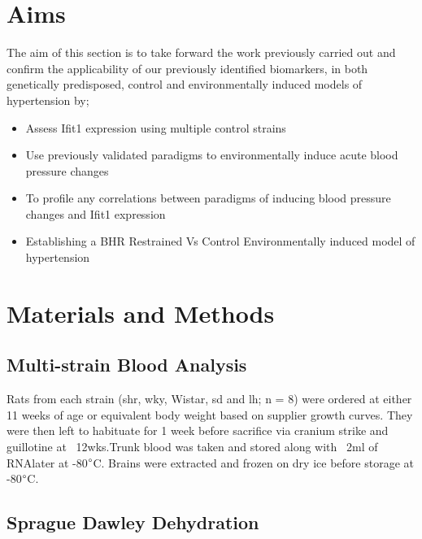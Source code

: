 \section{Aims}
The aim of this section is to take forward the work previously carried out and confirm the applicability of our previously identified biomarkers, in both genetically predisposed, control and environmentally induced models of hypertension by;\\
\begin{itemize}
\singlespacing
\setlength
	\item Assess Ifit1 expression using multiple control strains \\
	\item Use previously validated paradigms to environmentally induce acute blood pressure changes \\
	\item To profile any correlations between paradigms of inducing blood pressure changes and Ifit1 expression \\
	\item Establishing a BHR Restrained Vs Control Environmentally induced model of hypertension \\
\end{itemize}

\doublespacing

\section{Materials and Methods}

\subsection{Multi-strain Blood Analysis}

Rats from each strain (\acrshort{shr}, \acrshort{wky}, Wistar, \acrshort{sd} and \acrshort{lh}; n = 8) were ordered at either 11 weeks of age or equivalent body weight based on supplier growth curves. They were then left to habituate for 1 week before sacrifice via cranium strike and guillotine at ~12wks.Trunk blood was taken and stored along with ~2ml of RNAlater at -80$\degree$C. Brains were extracted and frozen on dry ice before storage at -80$\degree$C.  

\subsection{Sprague Dawley Dehydration}


